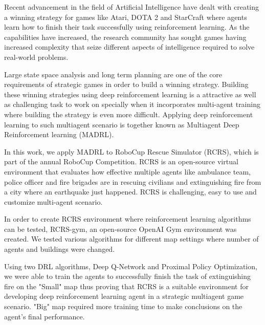 \documentclass[12pt]{report}
\begin{document}
\begin{thesisabstract}               

Recent advancement in the field of Artificial Intelligence have dealt with creating a winning strategy for games like Atari, DOTA 2 and StarCraft where agents learn how to finish their task successfully using reinforcement learning. As the capabilities have increased, the research community has sought games having increased complexity that seize different aspects of intelligence required to solve real-world problems. 

Large state space analysis and long term planning are one of the core requirements of strategic games in order to build a winning strategy. Building these winning strategies using deep reinforcement learning is a attractive as well as challenging task to work on specially when it incorporates multi-agent training where building the strategy is even more difficult. Applying deep reinforcement learning to such multiagent scenario is together known as Multiagent Deep Reinforcement learning (MADRL). 

In this work, we apply MADRL to RoboCup Rescue Simulator (RCRS), which is part of the annual RoboCup Competition. RCRS is an open-source virtual environment that evaluates how effective multiple agents like ambulance team, police officer and fire brigades are in rescuing civilians and extinguishing fire from a city where an earthquake just happened. RCRS is challenging, easy to use and customize multi-agent scenario. 

In order to create RCRS environment where reinforcement learning algorithms can be tested, RCRS-gym, an open-source OpenAI Gym environment was created. We tested various algorithms for different map settings where number of agents and buildings were changed. 

Using two DRL algorithms, Deep Q-Network and Proximal Policy Optimization, we were able to train the agents to successfully finish the task of extinguishing fire on the "Small" map thus proving that RCRS is a suitable environment for developing deep reinforcement learning agent in a strategic multiagent game scenario. "Big" map required more training time to make conclusions on the agent's final performance. 
                                
\end{thesisabstract}                 

\tableofcontents                     

\newpage
\end{document}
